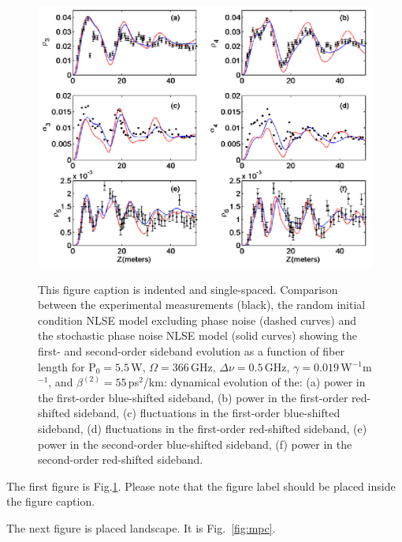 \begin{figure}
\begin{center}
\includegraphics[width=6in]{nlsez55phaseornot.eps}
\end{center}
\renewcommand{\baselinestretch}{1}
\small\normalsize
\begin{quote}
\caption[Figure with caption indented]{This figure caption is indented and single-spaced.  Comparison between the experimental measurements \cite{hart1} (black), the random initial condition NLSE model excluding phase noise (dashed curves) and the stochastic phase noise NLSE model (solid curves) showing the first- and second-order sideband evolution as a function of fiber length for P$_{0} = 5.5$\,W, $\Omega = 366$\,GHz, $\Delta\nu = 0.5$\,GHz, $\gamma = 0.019$\,W$^{-1}$m$^{-1}$, and $\beta^{(2)} = 55$\,ps$^2$/km: dynamical evolution of the: (a) power in the first-order blue-shifted sideband, (b) power in the first-order red-shifted sideband, (c) fluctuations in the first-order blue-shifted sideband, (d) fluctuations in the first-order red-shifted sideband, (e) power in the second-order blue-shifted sideband, (f) power in the second-order red-shifted sideband. \label{fig:fig27}}
\end{quote}
\end{figure} 
\renewcommand{\baselinestretch}{2}
\small\normalsize

The first figure is Fig.\ref{fig:fig27}.   Please note that the figure label should be placed inside the figure caption.  
\newpage

The next figure is placed landscape.  It is Fig.~\ref{fig:mpc}.

